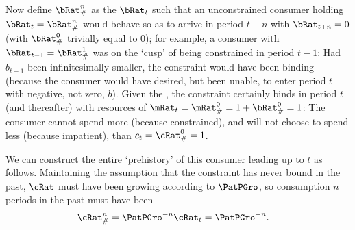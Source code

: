 \documentclass[\econtexRoot/BufferStockTheory]{subfiles}
\begin{document}
Now define $\bRat_{\#}^{n}$ as the $\bRat_{t}$ such that an unconstrained consumer holding $\bRat_{t}=\bRat_{\#}^{n}$ would behave so as to arrive in period $t+n$ with $\bRat_{t+n}=0$ (with $\bRat_{\#}^{0}$ trivially equal to 0); for example, a consumer with $\bRat_{t-1}=\bRat_{\#}^{1}$ was on the `cusp' of being constrained in period $t-1$: Had $b_{t-1}$ been infinitesimally smaller, the constraint would have been binding (because the consumer would have desired, but been unable, to enter period $t$ with negative, not zero, $b$).  Given
the \GICRaw, the constraint certainly binds in period $t$ (and thereafter) with resources of $\mRat_{t}=\mRat_{\#}^{0}=1+\bRat_{\#}^{0}=1$: The consumer cannot spend more (because constrained), and will not choose to spend less (because impatient), than $c_{t}=\cRat_{\#}^{0}=1$.

We can construct the entire `prehistory' of this consumer leading up to $t$ as follows.
Maintaining the assumption that the constraint has never bound in the past,
$\cRat$ must have been growing according to $\PatPGro$, so consumption $n$ periods in the past must have been
\begin{equation}\begin{gathered}\begin{aligned}
  \cRat_{\#}^{n}  & = \PatPGro^{-n} \cRat_{t} = \PatPGro^{-n}. \label{eq:cPreHist}
\end{aligned}\end{gathered}\end{equation}
\end{document}
